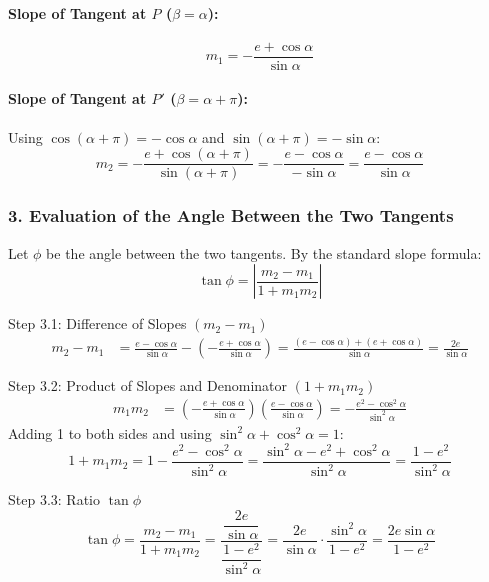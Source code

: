 \documentclass[11pt,a4paper]{article}
\begin{document}
\paragraph{Slope of Tangent at $P$ ($\beta = \alpha$):}
\[
m_1 = -\frac{e + \cos\alpha}{\sin\alpha}
\]
\paragraph{Slope of Tangent at $P'$ ($\beta = \alpha + \pi$):}
Using $\cos(\alpha + \pi) = -\cos\alpha$ and $\sin(\alpha + \pi) = -\sin\alpha$:
\[
m_2 = -\frac{e + \cos(\alpha + \pi)}{\sin(\alpha + \pi)} = -\frac{e - \cos\alpha}{-\sin\alpha} = \frac{e - \cos\alpha}{\sin\alpha}
\]

\clearpage
\subsubsection*{3. Evaluation of the Angle Between the Two Tangents}
Let $\phi$ be the angle between the two tangents. By the standard slope formula:
\[
\tan\phi = \left| \frac{m_2 - m_1}{1 + m_1 m_2} \right|
\]

\begin{stepbox}{Step 3.1: Difference of Slopes $(m_2 - m_1)$}
\begin{align*}
m_2 - m_1 &= \frac{e - \cos\alpha}{\sin\alpha} - \left(-\frac{e + \cos\alpha}{\sin\alpha}\right) = \frac{(e - \cos\alpha) + (e + \cos\alpha)}{\sin\alpha} = \frac{2e}{\sin\alpha}
\end{align*}
\end{stepbox}

\begin{stepbox}{Step 3.2: Product of Slopes and Denominator $(1 + m_1 m_2)$}
\begin{align*}
m_1 m_2 &= \left(-\frac{e + \cos\alpha}{\sin\alpha}\right)\left(\frac{e - \cos\alpha}{\sin\alpha}\right) = -\frac{e^2 - \cos^2\alpha}{\sin^2\alpha}
\end{align*}
Adding 1 to both sides and using $\sin^2\alpha + \cos^2\alpha = 1$:
\[
1 + m_1 m_2 = 1 - \frac{e^2 - \cos^2\alpha}{\sin^2\alpha} = \frac{\sin^2\alpha - e^2 + \cos^2\alpha}{\sin^2\alpha} = \frac{1 - e^2}{\sin^2\alpha}
\]
\end{stepbox}

\begin{stepbox}{Step 3.3: Ratio $\tan\phi$}
\[
\tan\phi = \frac{m_2 - m_1}{1 + m_1 m_2} = \frac{\dfrac{2e}{\sin\alpha}}{\dfrac{1 - e^2}{\sin^2\alpha}} = \frac{2e}{\sin\alpha} \cdot \frac{\sin^2\alpha}{1 - e^2} = \frac{2e\sin\alpha}{1 - e^2}
\]
\end{stepbox}
\end{document}
